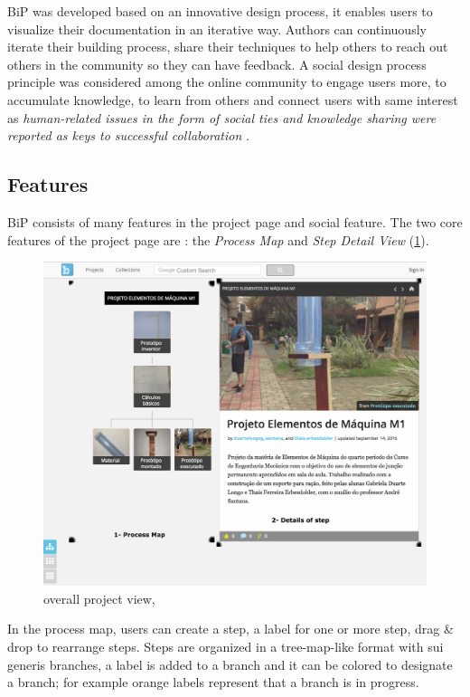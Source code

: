 BiP was developed based on an innovative design process, it enables users to visualize their documentation in an iterative way. Authors can continuously iterate their building process, share their techniques to help others to reach out others in the community so they can have feedback. A social design process principle was considered among the online community to engage users more, to accumulate knowledge, to learn from others and connect users with same interest as \textit{human-related issues in the form of social ties and knowledge sharing were reported as keys to successful collaboration} \cite{Kotlarsky2005}.

\subsection{Features}\label{sec:feature}
BiP consists of many features in the project page and social feature. The two core features of the project page are : the \textit{Process Map} and \textit{Step Detail View } (\ref{img-bipprojectpage}).
\begin{figure}[ht!]
	\centering
	\includegraphics[width=.3\textheight]{./images/img-bipprojectpage.png}
	\caption{overall project view, \cite[\url{http://buildinprogress.media.mit.edu/projects/4599/steps}]{BuildinP2}} 
	\label{img-bipprojectpage}
\end{figure}
In the process map, users can create a step, a label for one or more step, drag \& drop  to rearrange steps. Steps are organized in a tree-map-like format with sui generis branches, a label is added to a branch and it can be colored to designate a branch; for example orange labels represent that a branch is in progress.

